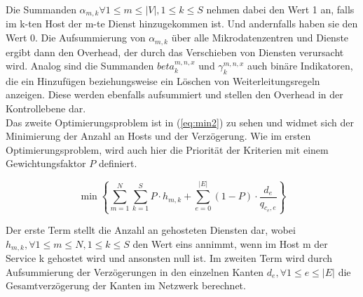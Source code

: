 \documentclass[conference]{IEEEtran}
\begin{document}
Die Summanden \(\alpha_{m,k} \forall 1\le m \le |V|, 1 \le k \le S\) nehmen dabei den Wert 1 an, falls im k-ten Host der m-te Dienst hinzugekommen ist. Und andernfalls haben sie den Wert 0. Die Aufsummierung von \(\alpha_{m,k}\) über alle Mikrodatenzentren und Dienste ergibt dann den Overhead, der durch das Verschieben von Diensten verursacht wird. 
Analog sind die Summanden \(beta_{k}^{m,n,x}\) und \(\gamma_{k}^{m,n,x}\) auch binäre Indikatoren, die ein Hinzufügen beziehungsweise ein Löschen von Weiterleitungsregeln anzeigen. Diese werden ebenfalls aufsummiert und stellen den Overhead in der Kontrollebene dar.\\
Das zweite Optimierungsproblem ist in (\ref{eq:min2}) zu sehen und widmet sich der Minimierung der Anzahl an Hosts und der Verzögerung. Wie im ersten Optimierungsproblem, wird auch hier die Priorität der Kriterien mit einem Gewichtungsfaktor \(P\) definiert.

\begin{equation}
\min \left\{ \sum_{m=1}^N \sum_{k=1}^S P \cdot h_{m,k} + \sum_{e=0}^{|E|} (1-P) \cdot \frac{d_e}{q_{c_{e},e}} \right\}
\label{eq:min2}
\end{equation}

Der erste Term stellt die Anzahl an gehosteten Diensten dar, wobei \(h_{m,k},\forall 1 \le m \le N, 1\le k \le S\) den Wert eins annimmt, wenn im Host m der Service k gehostet wird und ansonsten null ist.
Im zweiten Term wird durch Aufsummierung der Verzögerungen in den einzelnen Kanten \(d_e, \forall 1 \le e \le |E|\) die Gesamtverzögerung der Kanten im Netzwerk berechnet.
\end{document}
